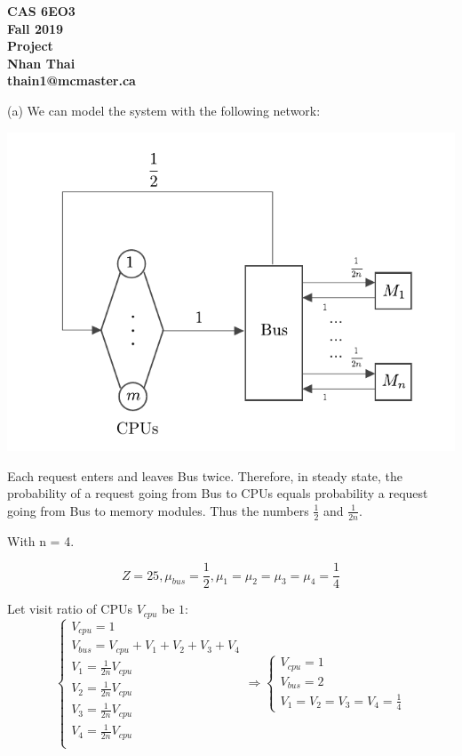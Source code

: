 \documentclass[12pt,fleqn]{article}
\begin{document}
  \bc

  {\large \textbf{CAS 6EO3}}\\[2mm]
  {\large \textbf{Fall 2019}}\\[8mm]
  {\huge \textbf{Project}}\\[6mm]
  {\large \textbf{Nhan Thai}}\\[2mm]
  {\large \textbf{thain1@mcmaster.ca}}\\[6mm]

  \ec

  \be
  \item[(a)] We can model the system with the following network:
  \begin{center}
    \includegraphics{network.pdf}
  \end{center}

  Each request enters and leaves Bus twice. Therefore, in steady state, the probability of a request going from
  Bus to CPUs equals probability a request going from Bus to memory modules. Thus the numbers $\frac{1}{2}$ and $\frac{1}{2n}$.

  With n = 4.

  \[
    Z = 25, \mu_{bus} = \frac{1}{2}, \mu_1 = \mu_2 = \mu_3 = \mu_4 = \frac{1}{4}
  \]


  Let visit ratio of CPUs $V_{cpu}$ be $1$:
  \[
    \begin{cases}
      V_{cpu} = 1 \\
      V_{bus} = V_{cpu} + V_1 + V_2 + V_3 + V_4 \\
      V_{1} = \frac{1}{2n}V_{cpu} \\
      V_{2} = \frac{1}{2n}V_{cpu} \\
      V_{3} = \frac{1}{2n}V_{cpu} \\
      V_{4} = \frac{1}{2n}V_{cpu} \\
    \end{cases}
    \Rightarrow
    \begin{cases}
      V_{cpu} = 1 \\
      V_{bus} = 2 \\
      V_1 = V_2 = V_3 = V_4 = \frac{1}{4}
    \end{cases}
  \]
\end{document}

